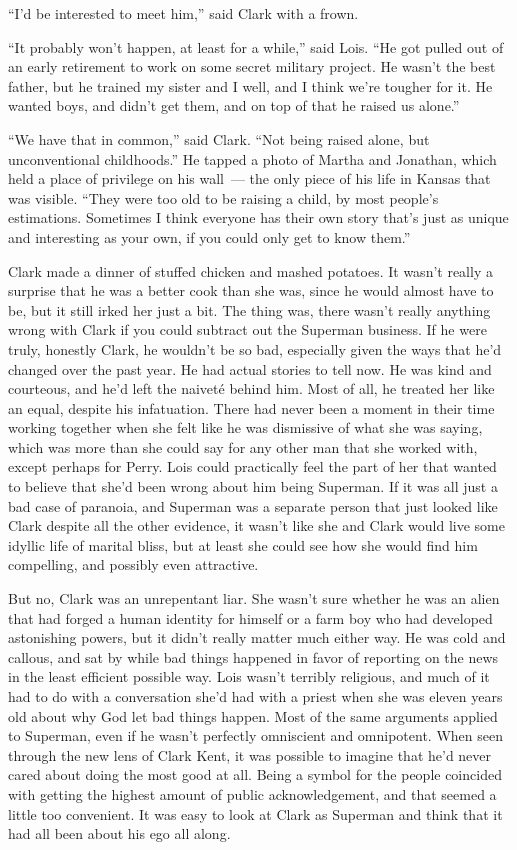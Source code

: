 ``I'd be interested to meet him,'' said Clark with a frown.

``It probably won't happen, at least for a while,'' said Lois. ``He got
pulled out of an early retirement to work on some secret military
project. He wasn't the best father, but he trained my sister and I well,
and I think we're tougher for it. He wanted boys, and didn't get them,
and on top of that he raised us alone.''

``We have that in common,'' said Clark. ``Not being raised alone, but
unconventional childhoods.'' He tapped a photo of Martha and Jonathan,
which held a place of privilege on his wall~--- the only piece of his
life in Kansas that was visible. ``They were too old to be raising a
child, by most people's estimations. Sometimes I think everyone has
their own story that's just as unique and interesting as your own, if
you could only get to know them.''

Clark made a dinner of stuffed chicken and mashed potatoes. It wasn't
really a surprise that he was a better cook than she was, since he would
almost have to be, but it still irked her just a bit. The thing was,
there wasn't really anything wrong with Clark if you could subtract out
the Superman business. If he were truly, honestly Clark, he wouldn't be
so bad, especially given the ways that he'd changed over the past year.
He had actual stories to tell now. He was kind and courteous, and he'd
left the naiveté behind him. Most of all, he treated her like an equal,
despite his infatuation. There had never been a moment in their time
working together when she felt like he was dismissive of what she was
saying, which was more than she could say for any other man that she
worked with, except perhaps for Perry. Lois could practically feel the
part of her that wanted to believe that she'd been wrong about him being
Superman. If it was all just a bad case of paranoia, and Superman was a
separate person that just looked like Clark despite all the other
evidence, it wasn't like she and Clark would live some idyllic life of
marital bliss, but at least she could see how she would find him
compelling, and possibly even attractive.

But no, Clark was an unrepentant liar. She wasn't sure whether he was an
alien that had forged a human identity for himself or a farm boy who had
developed astonishing powers, but it didn't really matter much either
way. He was cold and callous, and sat by while bad things happened in
favor of reporting on the news in the least efficient possible way. Lois
wasn't terribly religious, and much of it had to do with a conversation
she'd had with a priest when she was eleven years old about why God let
bad things happen. Most of the same arguments applied to Superman, even
if he wasn't perfectly omniscient and omnipotent. When seen through the
new lens of Clark Kent, it was possible to imagine that he'd never cared
about doing the most good at all. Being a symbol for the people
coincided with getting the highest amount of public acknowledgement, and
that seemed a little too convenient. It was easy to look at Clark as
Superman and think that it had all been about his ego all along.

